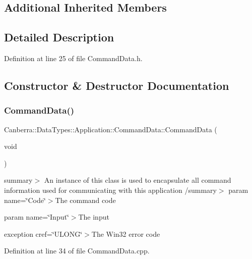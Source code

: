 \subsection*{Additional Inherited Members}


\subsection{Detailed Description}


Definition at line 25 of file Command\+Data.\+h.



\subsection{Constructor \& Destructor Documentation}
\mbox{\label{class_canberra_1_1_data_types_1_1_application_1_1_command_data_a941aae1b371ee382c9f7fe225c534f95_a941aae1b371ee382c9f7fe225c534f95}} 
\subsubsection{\texorpdfstring{Command\+Data()}{CommandData()}}
{\footnotesize\ttfamily Canberra\+::\+Data\+Types\+::\+Application\+::\+Command\+Data\+::\+Command\+Data (\begin{DoxyParamCaption}\item[{void}]{ }\end{DoxyParamCaption})}

summary$>$ An instance of this class is used to encapsulate all command information used for communicating with this application /summary$>$ param name=\char`\"{}\+Code\char`\"{}$>$The command code

param name=\char`\"{}\+Input\char`\"{}$>$The input

exception cref=\char`\"{}\+U\+L\+O\+N\+G\char`\"{}$>$The Win32 error code

Definition at line 34 of file Command\+Data.\+cpp.

\mbox{\label{class_canberra_1_1_data_types_1_1_application_1_1_command_data_ae25012d2eda50e7767d5a25a994da4a6_ae25012d2eda50e7767d5a25a994da4a6}} 
